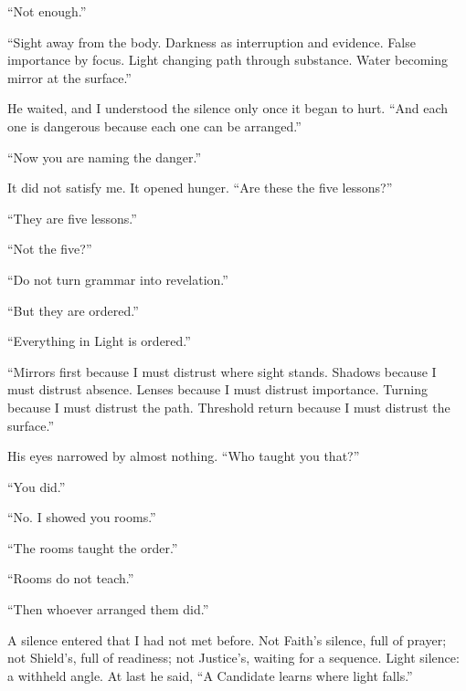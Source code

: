 ``Not enough.''\par

``Sight away from the body. Darkness as interruption and evidence. False importance by focus. Light changing path through substance. Water becoming mirror at the surface.''\par

He waited, and I understood the silence only once it began to hurt. ``And each one is dangerous because each one can be arranged.''\par

``Now you are naming the danger.''\par

It did not satisfy me. It opened hunger. ``Are these the five lessons?''\par

``They are five lessons.''\par

``Not the five?''\par

``Do not turn grammar into revelation.''\par

``But they are ordered.''\par

``Everything in Light is ordered.''\par

``Mirrors first because I must distrust where sight stands. Shadows because I must distrust absence. Lenses because I must distrust importance. Turning because I must distrust the path. Threshold return because I must distrust the surface.''\par

His eyes narrowed by almost nothing. ``Who taught you that?''\par

``You did.''\par

``No. I showed you rooms.''\par

``The rooms taught the order.''\par

``Rooms do not teach.''\par

``Then whoever arranged them did.''\par

A silence entered that I had not met before. Not Faith's silence, full of prayer; not Shield's, full of readiness; not Justice's, waiting for a sequence. Light silence: a withheld angle. At last he said, ``A Candidate learns where light falls.''\par


